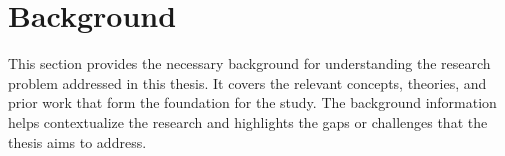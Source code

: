\section{Background}
\label{sec::Background}
    
This section provides the necessary background for understanding the research problem addressed in this thesis. It covers the relevant concepts, theories, and prior work that form the foundation for the study. The background information helps contextualize the research and highlights the gaps or challenges that the thesis aims to address.